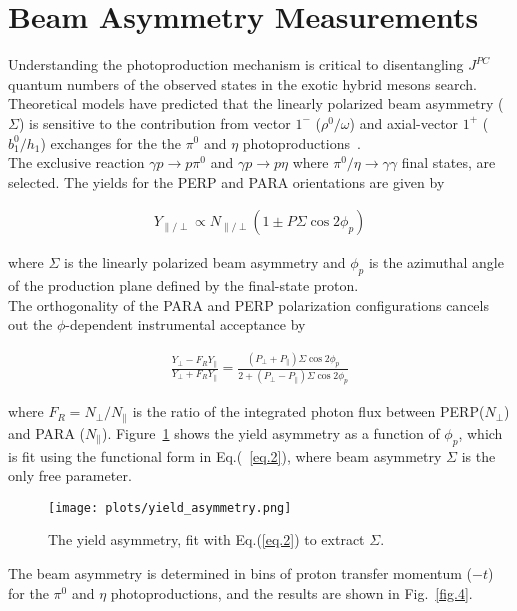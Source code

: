 \documentclass[a4paper]{jpconf}
\begin{document}
\section{Beam Asymmetry Measurements}
Understanding the photoproduction mechanism is critical to disentangling $J^{PC}$ quantum numbers of the observed states in the exotic hybrid mesons search. Theoretical models have predicted that the linearly polarized beam asymmetry ($\Sigma$) is sensitive to the contribution from vector $1^{-}$ ($\rho^{0}/\omega$) and axial-vector $1^{+}$ ($b_{1}^{0}/h_{1}$) exchanges for the the $\pi^{0}$ and $\eta$ photoproductions~\cite{ref.4}.\\
The exclusive reaction $\gamma p \rightarrow p \pi^{0}$ and $\gamma p \rightarrow p \eta$ where $\pi^{0}/\eta\rightarrow \gamma\gamma$ final states, are selected. The yields for the PERP and PARA orientations are given by

\begin{align}
Y_{\parallel/\perp} \propto N_{\parallel/\perp}(1 \pm P \Sigma \cos 2\phi_{p})
\label{eq.1}
\end{align}

where $\Sigma$ is the linearly polarized beam asymmetry and $\phi_{p}$ is the azimuthal angle of the production plane defined by the final-state proton.\\
The orthogonality of the PARA and PERP polarization configurations cancels out the $\phi$-dependent instrumental acceptance by

\begin{align}
\frac{Y_{\perp}-F_{R}Y_{\parallel}}{Y_{\perp}+F_{R}Y_{\parallel}} = \frac{(P_{\perp}+P_{\parallel})\Sigma \cos 2\phi_{p}}{2+(P_{\perp}-P_{\parallel})\Sigma \cos 2\phi_{p}}
\label{eq.2}
\end{align}

where $F_{R} = N_{\perp}/N_{\parallel}$ is the ratio of the integrated photon flux between PERP($N_{\perp}$) and PARA ($N_{\parallel}$). Figure~\ref{fig.3} shows the yield asymmetry as a function of $\phi_{p}$, which is fit using the functional form in Eq.(~\ref{eq.2}), where beam asymmetry $\Sigma$ is the only free parameter.

\begin{figure}[h]
    \centering
    \texttt{[image: plots/yield\_asymmetry.png]}
    \caption{\label{fig.3}The yield asymmetry, fit with Eq.(\ref{eq.2}) to extract $\Sigma$.}
\end{figure}

The beam asymmetry is determined in bins of proton transfer momentum ($-t$) for the $\pi^{0}$ and $\eta$ photoproductions, and the results are shown in Fig.~\ref{fig.4}.
\end{document}
